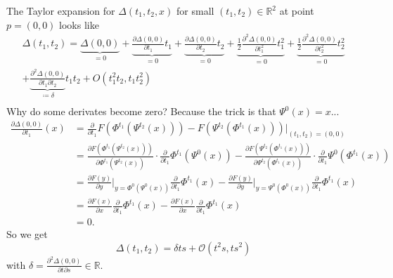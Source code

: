 \documentclass[hidelinks,a4paper, 11pt]{article}
\theoremstyle{plain}
\theoremstyle{break}
\theoremstyle{plain}
\theoremstyle{definition}
\begin{document}
The Taylor expansion for $\Delta(t_1,t_2,x)$ for small $(t_1,t_2) \in \mathbb R^2$ at point $p=(0,0)$ looks like
\begin{align*}
\Delta(t_1,t_2) = \underbrace{\Delta(0,0)}_{=0} + \underbrace{\frac{\partial \Delta(0,0)}{\partial t_1}t_1}_{=0} + \underbrace{\frac{\partial \Delta(0,0)}{\partial t_2}t_2}_{=0} + \underbrace{ \frac{1}{2}\frac{\partial^2\Delta(0,0)}{\partial t_1^2}t_1^2}_{=0} + \underbrace{\frac{1}{2}\frac{\partial^2\Delta(0,0)}{\partial t_2^2}t_2^2}_{=0} \\
+ \underbrace{\frac{\partial^2\Delta(0,0)}{\partial t_1 \partial t_2}}_{\coloneqq \delta}t_1t_2 + O(t_1^2t_2,t_1t_2^2) \\
\end{align*}
Why do some derivates become zero? Because the trick is that $\Psi^0(x) = x$...
\begin{align*}
	\frac{\partial \Delta(0,0)}{\partial t_1}(x) &= \frac{\partial}{\partial t_1}F(\Phi^{t_1}(\Psi^{t_2}(x))) - F(\Psi^{t_2}(\Phi^{t_1}(x)))\Big \vert_{(t_1,t_2) = (0,0)} \\
	&= \frac{\partial F\left(\Phi^{t_1}(\Psi^{t_2}(x))\right)}{\partial \Phi^{t_1}(\Psi^{t_2}(x))} \cdot \frac{\partial }{\partial t_1}\Phi^{t_1}(\Psi^{0}(x)) - \frac{\partial F\left(\Psi^{t_2}(\Phi^{t_1}(x))\right)}{\partial \Psi^{t_2}(\Phi^{t_1}(x))} \cdot \frac{\partial }{\partial t_1}\Psi^{0}(\Phi^{t_1}(x))\\ 
	&= \frac{\partial F(y)}{\partial y} \Big \vert_{y = \Phi^{0}(\Psi^{0}(x))} \frac{\partial}{\partial t_1}\Phi^{t_1}(x) -  \frac{\partial F(y)}{\partial y} \Big \vert_{y = \Psi^{0}(\Phi^{0}(x))} \frac{\partial}{\partial t_1}\Phi^{t_1}(x)  \\
	&= \frac{\partial F(x)}{\partial x} \frac{\partial}{\partial t_1}\Phi^{t_1}(x) -  \frac{\partial F(x)}{\partial x}  \frac{\partial}{\partial t_1}\Phi^{t_1}(x) \\
	&= 0.
\end{align*}
So we get
\[
	\Delta(t_1,t_2) = \delta ts +  \mathcal O(t^2s,ts^2)
\]
with $\delta = \frac{\partial^2\Delta(0,0)}{\partial t \partial s} \in \mathbb R$. \\
\end{document}
